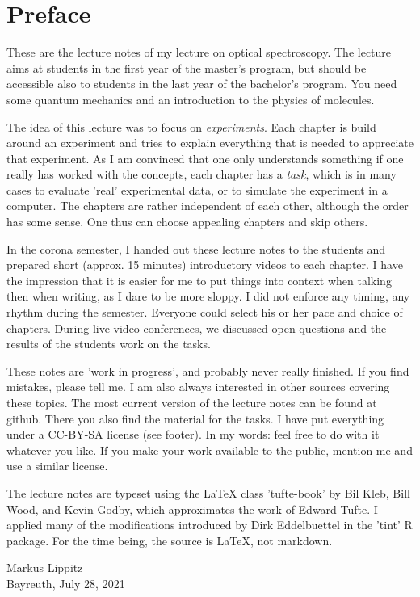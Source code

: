 \renewcommand{\lastmod}{\ \ }
\renewcommand{\chapterauthors}{\ \ }

\chapter*{Preface}


These are the lecture notes of my lecture on optical spectroscopy. The lecture aims at students in the first year of the master's program, but should be accessible also to students in the last year of the bachelor's program. You need some quantum mechanics and an introduction to the physics of molecules.

The idea of this lecture was to focus on \emph{experiments}. Each chapter is build around an experiment and tries to explain everything that is needed to appreciate that experiment. As I am convinced that one only understands something if one really has worked with the concepts, each chapter has a \emph{task}, which is in many cases to evaluate 'real' experimental data, or to simulate the experiment in a computer. The chapters are rather independent of each other, although the order has some sense. One thus can choose appealing chapters and skip others.

In the corona semester, I handed out these lecture notes to the students and prepared short (approx. 15 minutes) introductory videos to each chapter. I have the impression that it is easier for me to put things into context when talking then when writing, as I dare to be more sloppy. I did not enforce any timing, any rhythm during the semester. Everyone could select his or her pace and choice of chapters. During live video conferences, we discussed open questions and the results of the students work on the tasks.

These notes are 'work in progress', and probably never really finished. If you find mistakes, please tell me. I am also always interested in other sources covering these topics.
The most current version of the lecture notes can be found at github. There you also find the material for the tasks. I have put everything under a CC-BY-SA license (see footer). In my words: feel free to do with it whatever you like. If you make your work available to the public, mention me and use a similar license. 


The lecture notes are typeset using the LaTeX class 'tufte-book' by Bil Kleb, Bill Wood, and Kevin Godby, which  approximates the work of Edward Tufte. I applied many of the modifications introduced by Dirk Eddelbuettel in the 'tint' R package. For the time being, the source is LaTeX, not markdown.

\vspace{2\baselineskip}

Markus Lippitz \\ Bayreuth, July 28, 2021

